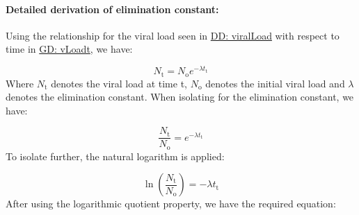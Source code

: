\documentclass[12pt]{article}
\begin{document}
\paragraph{Detailed derivation of elimination constant:}
\label{IM:calofElimConstDeriv}
Using the relationship for the viral load seen in \hyperref[DD:viralLoad]{DD: viralLoad} with respect to time in \hyperref[GD:vLoadt]{GD: vLoadt}, we have:

\begin{displaymath}
{N_{\text{t}}}={N_{\text{o}}} e^{-λ {t_{\text{t}}}}
\end{displaymath}
Where ${N_{\text{t}}}$ denotes the viral load at time t, ${N_{\text{o}}}$ denotes the initial viral load and $λ$ denotes the elimination constant. When isolating for the elimination constant,  we have:

\begin{displaymath}
\frac{{N_{\text{t}}}}{{N_{\text{o}}}}=e^{-λ {t_{\text{t}}}}
\end{displaymath}
To isolate further, the natural logarithm is applied:

\begin{displaymath}
\ln\left(\frac{{N_{\text{t}}}}{{N_{\text{o}}}}\right)=-λ {t_{\text{t}}}
\end{displaymath}
After using the logarithmic quotient property, we have the required equation:
\end{document}

